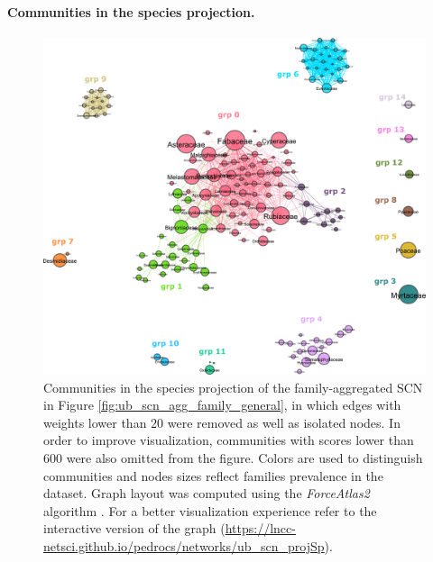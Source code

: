\paragraph{Communities in the species projection.}
\begin{figure}[!ht]
  	\centering
    \includegraphics[width=\linewidth]{figures/casestudy_ub/scn_family_projSp_communities.pdf}
    \caption[Communities in the species projection of the family-aggregated SCN.]{ Communities in the species projection of the family-aggregated SCN in Figure \ref{fig:ub_scn_agg_family_general}, in which edges with weights lower than $20$ were removed as well as isolated nodes. In order to improve visualization, communities with scores lower than $600$ were also omitted from the figure. Colors are used to distinguish communities and nodes sizes reflect families prevalence in the dataset.
        Graph layout was computed using the \textit{ForceAtlas2} algorithm \cite{Jacomy2014}. For a better visualization experience refer to the interactive version of the graph (\url{https://lncc-netsci.github.io/pedrocs/networks/ub_scn_projSp}).}
    \label{fig:ub_scn_family_projSp_communities}
\end{figure}

